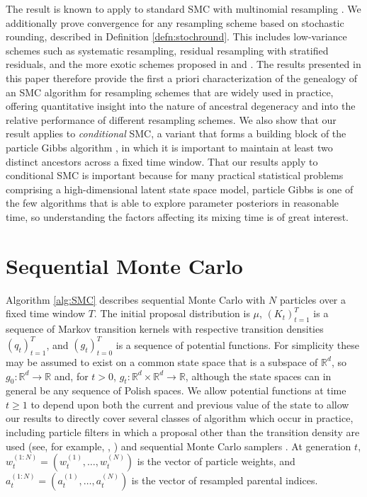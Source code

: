\documentclass{article}
\theoremstyle{definition}
\newcommand{\1}[1]{\mathbbm{1}_{\{#1\}}}
\begin{document}
The result is known to apply to standard SMC with multinomial resampling \citep[Corollary 1]{koskela2018}. 
We additionally prove convergence for any resampling scheme based on stochastic rounding, described in Definition \ref{defn:stochround}. This includes low-variance schemes such as systematic resampling, residual resampling with stratified residuals, and the more exotic schemes proposed in \citet{crisan1997} and \citet{gerber2017}. The results presented in this paper therefore provide the first a priori characterization of the genealogy of an SMC algorithm for resampling schemes that are widely used in practice, offering quantitative insight into the nature of ancestral degeneracy and into the relative performance of different resampling schemes. We also show that our result applies to \emph{conditional} SMC, a variant that forms a building block of the particle Gibbs algorithm \citep{andrieu2010}, in which it is important to maintain at least two distinct ancestors across a fixed time window. That our results apply to conditional SMC is important because for many practical statistical problems comprising a high-dimensional latent state space model, particle Gibbs is one of the few algorithms that is able to explore parameter posteriors in reasonable time, so understanding the factors affecting its mixing time is of great interest.

\section{Sequential Monte Carlo}
Algorithm \ref{alg:SMC} describes sequential Monte Carlo with $N$ particles over a fixed time window $T$.
The initial proposal distribution is $\mu$, $(K_t)_{t=1}^T$ is a sequence of Markov transition kernels with respective transition densities $(q_t)_{t=1}^T$, and $(g_t)_{t=0}^T$ is a sequence of potential functions.
For simplicity these may be assumed to exist on a common state space that is a subspace of $\mathbb{R}^d$, so $g_0: \mathbb{R}^d \to \mathbb{R}$ and, for $t>0$, $g_t: \mathbb{R}^d \times\mathbb{R}^d \to \mathbb{R}$,
although the state spaces can in general be any sequence of Polish spaces. We allow potential functions at time $t \geq 1$ to depend upon both the current and previous value of the state to allow our results to directly cover several classes of algorithm which occur in practice, including particle filters in which a proposal other than the transition density are used (see, for example, \citet[Section 4.1]{doucet2009}, \citet[Section 10.3.2]{chopin2020}) and sequential Monte Carlo samplers \citep{delmoral2006}.
At generation $t$, $w_t^{(1:N)} = (w_t^{(1)},\ldots,w_t^{(N)})$ is the vector of particle weights, and $a_t^{(1:N)} = (a_t^{(1)},\ldots,a_t^{(N)})$ is the vector of resampled parental indices.
\end{document}
